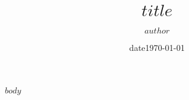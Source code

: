 \documentclass{gara}
\title{$title$}
\author{$author$}
\date{date}
\date{\today}
\begin{document}
\maketitle

$body$



\end{document}
